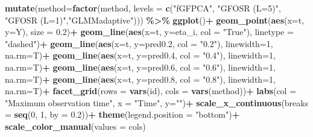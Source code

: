 \documentclass[
]{article}
\newenvironment{Shaded}{\begin{snugshade}}{\end{snugshade}}
\newcommand{\AttributeTok}[1]{\textcolor[rgb]{0.13,0.29,0.53}{#1}}
\newcommand{\DecValTok}[1]{\textcolor[rgb]{0.00,0.00,0.81}{#1}}
\newcommand{\FloatTok}[1]{\textcolor[rgb]{0.00,0.00,0.81}{#1}}
\newcommand{\FunctionTok}[1]{\textcolor[rgb]{0.13,0.29,0.53}{\textbf{#1}}}
\newcommand{\NormalTok}[1]{#1}
\newcommand{\SpecialCharTok}[1]{\textcolor[rgb]{0.81,0.36,0.00}{\textbf{#1}}}
\newcommand{\StringTok}[1]{\textcolor[rgb]{0.31,0.60,0.02}{#1}}
\begin{document}
\begin{Shaded}
\begin{Highlighting}[]
  \FunctionTok{mutate}\NormalTok{(}\AttributeTok{method=}\FunctionTok{factor}\NormalTok{(method, }
         \AttributeTok{levels =} \FunctionTok{c}\NormalTok{(}\StringTok{"fGFPCA"}\NormalTok{, }\StringTok{"GFOSR (L=5)"}\NormalTok{, }\StringTok{"GFOSR (L=1)"}\NormalTok{,}\StringTok{"GLMMadaptive"}\NormalTok{))) }\SpecialCharTok{\%\textgreater{}\%}
  \FunctionTok{ggplot}\NormalTok{()}\SpecialCharTok{+}
  \FunctionTok{geom\_point}\NormalTok{(}\FunctionTok{aes}\NormalTok{(}\AttributeTok{x=}\NormalTok{t, }\AttributeTok{y=}\NormalTok{Y), }\AttributeTok{size =} \FloatTok{0.2}\NormalTok{)}\SpecialCharTok{+}
  \FunctionTok{geom\_line}\NormalTok{(}\FunctionTok{aes}\NormalTok{(}\AttributeTok{x=}\NormalTok{t, }\AttributeTok{y=}\NormalTok{eta\_i, }\AttributeTok{col =} \StringTok{"True"}\NormalTok{), }\AttributeTok{linetype =} \StringTok{"dashed"}\NormalTok{)}\SpecialCharTok{+}
  \FunctionTok{geom\_line}\NormalTok{(}\FunctionTok{aes}\NormalTok{(}\AttributeTok{x=}\NormalTok{t, }\AttributeTok{y=}\NormalTok{pred0}\FloatTok{.2}\NormalTok{, }\AttributeTok{col =} \StringTok{"0.2"}\NormalTok{), }\AttributeTok{linewidth=}\DecValTok{1}\NormalTok{, }\AttributeTok{na.rm=}\NormalTok{T)}\SpecialCharTok{+}
  \FunctionTok{geom\_line}\NormalTok{(}\FunctionTok{aes}\NormalTok{(}\AttributeTok{x=}\NormalTok{t, }\AttributeTok{y=}\NormalTok{pred0}\FloatTok{.4}\NormalTok{, }\AttributeTok{col =} \StringTok{"0.4"}\NormalTok{), }\AttributeTok{linewidth=}\DecValTok{1}\NormalTok{, }\AttributeTok{na.rm=}\NormalTok{T)}\SpecialCharTok{+}
  \FunctionTok{geom\_line}\NormalTok{(}\FunctionTok{aes}\NormalTok{(}\AttributeTok{x=}\NormalTok{t, }\AttributeTok{y=}\NormalTok{pred0}\FloatTok{.6}\NormalTok{, }\AttributeTok{col =} \StringTok{"0.6"}\NormalTok{), }\AttributeTok{linewidth=}\DecValTok{1}\NormalTok{, }\AttributeTok{na.rm=}\NormalTok{T)}\SpecialCharTok{+}
  \FunctionTok{geom\_line}\NormalTok{(}\FunctionTok{aes}\NormalTok{(}\AttributeTok{x=}\NormalTok{t, }\AttributeTok{y=}\NormalTok{pred0}\FloatTok{.8}\NormalTok{, }\AttributeTok{col =} \StringTok{"0.8"}\NormalTok{), }\AttributeTok{linewidth=}\DecValTok{1}\NormalTok{, }\AttributeTok{na.rm=}\NormalTok{T)}\SpecialCharTok{+}
  \FunctionTok{facet\_grid}\NormalTok{(}\AttributeTok{rows =} \FunctionTok{vars}\NormalTok{(id), }\AttributeTok{cols =} \FunctionTok{vars}\NormalTok{(method))}\SpecialCharTok{+}
  \FunctionTok{labs}\NormalTok{(}\AttributeTok{col =} \StringTok{"Maximum observation time"}\NormalTok{, }\AttributeTok{x =} \StringTok{"Time"}\NormalTok{, }\AttributeTok{y=}\StringTok{""}\NormalTok{)}\SpecialCharTok{+}
  \FunctionTok{scale\_x\_continuous}\NormalTok{(}\AttributeTok{breaks =} \FunctionTok{seq}\NormalTok{(}\DecValTok{0}\NormalTok{, }\DecValTok{1}\NormalTok{, }\AttributeTok{by =} \FloatTok{0.2}\NormalTok{))}\SpecialCharTok{+}
  \FunctionTok{theme}\NormalTok{(}\AttributeTok{legend.position =} \StringTok{"bottom"}\NormalTok{)}\SpecialCharTok{+}
  \FunctionTok{scale\_color\_manual}\NormalTok{(}\AttributeTok{values =}\NormalTok{ cols)}
\end{Highlighting}
\end{Shaded}
\end{document}
